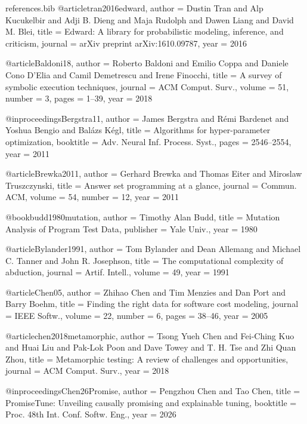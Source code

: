 \documentclass[pdflatex,sn-basic]{sn-jnl}
\begin{document}
\begin{filecontents}{references.bib}
@article{tran2016edward,
  author = {Dustin Tran and Alp Kucukelbir and Adji B. Dieng and Maja Rudolph and Dawen Liang and David M. Blei},
  title = {{Edward: A library for probabilistic modeling, inference, and criticism}},
  journal = {arXiv preprint arXiv:1610.09787},
  year = {2016}
}


@article{Baldoni18,
  author  = {Roberto Baldoni and Emilio Coppa and Daniele Cono D'Elia and Camil Demetrescu and Irene Finocchi},
  title   = {A survey of symbolic execution techniques},
  journal = {ACM Comput. Surv.},
  volume  = {51},
  number  = {3},
  pages   = {1--39},
  year    = {2018}
}


@inproceedings{Bergstra11,
  author    = {James Bergstra and R{\'e}mi Bardenet and Yoshua Bengio and Bal{\'a}zs K{\'e}gl},
  title     = {Algorithms for hyper-parameter optimization},
  booktitle = {Adv. Neural Inf. Process. Syst.},
  pages     = {2546--2554},
  year      = {2011}
}



@article{Brewka2011,
  author  = {Gerhard Brewka and Thomas Eiter and Miroslaw Truszczynski},
  title   = {Answer set programming at a glance},
  journal = {Commun. ACM},
  volume  = {54},
  number  = {12},
  year    = {2011}
}


@book{budd1980mutation,
  author    = {Timothy Alan Budd},
  title     = {Mutation Analysis of Program Test Data},
  publisher = {Yale Univ.},
  year      = {1980}
}



@article{Bylander1991,
  author  = {Tom Bylander and Dean Allemang and Michael C. Tanner and John R. Josephson},
  title   = {The computational complexity of abduction},
  journal = {Artif. Intell.},
  volume  = {49},
  year    = {1991}
}



@article{Chen05,
  author  = {Zhihao Chen and Tim Menzies and Dan Port and Barry Boehm},
  title   = {Finding the right data for software cost modeling},
  journal = {IEEE Softw.},
  volume  = {22},
  number  = {6},
  pages   = {38--46},
  year    = {2005}
}



@article{chen2018metamorphic,
  author  = {Tsong Yueh Chen and Fei-Ching Kuo and Huai Liu and Pak-Lok Poon and Dave Towey and T. H. Tse and Zhi Quan Zhou},
  title   = {Metamorphic testing: A review of challenges and opportunities},
  journal = {ACM Comput. Surv.},
  year    = {2018}
}



@inproceedings{Chen26Promise,
  author    = {Pengzhou Chen and Tao Chen},
  title     = {PromiseTune: Unveiling causally promising and explainable tuning},
  booktitle = {Proc. 48th Int. Conf. Softw. Eng.},
  year      = {2026}
}




\end{filecontents}
\end{document}

